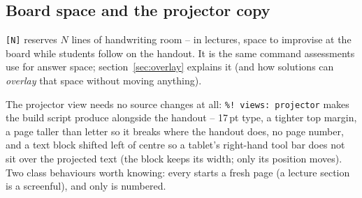 \subsection{Board space and the projector copy}

\texttt{[N]} reserves $N$ lines of handwriting room -- in
lectures, space to improvise at the board while students follow on the
handout. It is the same command assessments use for answer space;
section~\ref{sec:overlay} explains it (and how solutions can \emph{overlay}
that space without moving anything).

The projector view needs no source changes at all: \texttt{\%! views:
projector} makes the build script produce  alongside
the handout -- 17\,pt type, a tighter top margin, a page taller than letter so
it breaks where the handout does, no page number, and a text
block shifted left of centre so a tablet's right-hand tool bar does not sit
over the projected text (the block keeps its width; only its position moves).
Two class behaviours worth knowing: every  starts a fresh page (a
lecture section is a screenful), and only  is numbered.

